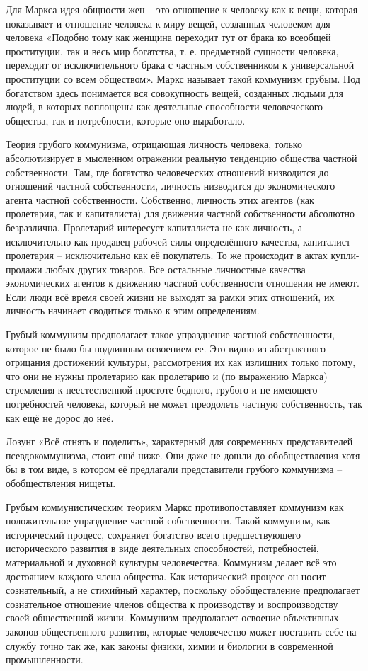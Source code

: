 \documentclass[12pt,a4paper,openany]{book}
\begin{document}
Для Маркса идея общности жен – это отношение к человеку как к вещи, которая показывает и отношение человека к миру вещей, созданных человеком для человека «Подобно тому как женщина переходит тут от брака ко всеобщей проституции, так и весь мир богатства, т. е. предметной сущности человека, переходит от исключительного брака с частным собственником к универсальной проституции со всем обществом». Маркс называет такой коммунизм грубым. Под богатством здесь понимается вся совокупность вещей, созданных людьми для людей, в которых воплощены как деятельные способности человеческого общества, так и потребности, которые оно выработало.

Теория грубого коммунизма, отрицающая личность человека, только абсолютизирует в мысленном отражении реальную тенденцию общества частной собственности. Там, где богатство человеческих отношений низводится до отношений частной собственности, личность низводится до экономического агента частной собственности. Собственно, личность этих агентов (как пролетария, так и капиталиста) для движения частной собственности абсолютно безразлична. Пролетарий интересует капиталиста не как личность, а исключительно как продавец рабочей силы определённого качества, капиталист пролетария – исключительно как её покупатель. То же происходит в актах купли-продажи любых других товаров. Все остальные личностные качества экономических агентов к движению частной собственности отношения не имеют. Если люди всё время своей жизни не выходят за рамки этих отношений, их личность начинает сводиться только к этим определениям.

Грубый коммунизм предполагает такое упразднение частной собственности, которое не было бы подлинным освоением ее. Это видно из абстрактного отрицания достижений культуры, рассмотрения их как излишних только потому, что они не нужны пролетарию как пролетарию и (по выражению Маркса) стремления к неестественной простоте бедного, грубого и не имеющего потребностей человека, который не может преодолеть частную собственность, так как ещё не дорос до неё.

Лозунг «Всё отнять и поделить», характерный для современных представителей псевдокоммунизма, стоит ещё ниже. Они даже не дошли до обобществления хотя бы в том виде, в котором её предлагали представители грубого коммунизма – обобществления нищеты.

Грубым коммунистическим теориям Маркс противопоставляет коммунизм как положительное упразднение частной собственности. Такой коммунизм, как исторический процесс, сохраняет богатство всего предшествующего исторического развития в виде деятельных способностей, потребностей, материальной и духовной культуры человечества. Коммунизм делает всё это достоянием каждого члена общества. Как исторический процесс он носит сознательный, а не стихийный характер, поскольку обобществление предполагает сознательное отношение членов общества к производству и воспроизводству своей общественной жизни. Коммунизм предполагает освоение объективных законов общественного развития, которые человечество может поставить себе на службу точно так же, как законы физики, химии и биологии в современной промышленности.
\end{document}
